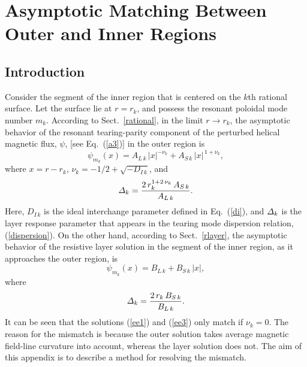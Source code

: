 \documentclass[12pt,prb,aps]{revtex4-1}
\begin{document}
\section{Asymptotic Matching Between Outer and Inner Regions}\label{asym}
\subsection{Introduction}
Consider the segment of the inner region that is centered on the $k$th rational surface. Let the surface lie at $r=r_k$, and possess the
resonant poloidal mode number $m_k$. According to Sect.~\ref{rational},   in the limit $r\rightarrow r_k$,  the asymptotic behavior of the resonant tearing-parity component of the perturbed helical magnetic 
flux, $\psi$,  [see Eq.~(\ref{a3})] in the outer region is
\begin{equation}\label{ee1}
\psi_{m_k}(x) = A_{L\,k}\,|x|^{-\nu_k} + A_{S\,k}\,|x|^{\,1+\nu_k},
\end{equation}
where $x=r-r_k$, $\nu_k= -1/2+\sqrt{-D_{I\,k}}$, and
\begin{equation}
{\mit\Delta}_k = \frac{2\,r_k^{1+2\,\nu_k}\,A_{S\,k}}{A_{L\,k}}.
\end{equation}
Here, $D_{I\,k}$ is the ideal interchange parameter defined in Eq.~(\ref{di}), and ${\mit\Delta}_k$ is the layer response parameter that appears in the
tearing mode dispersion relation, (\ref{dispersion}). On the other hand, according to Sect.~\ref{rlayer}, the asymptotic behavior of the resistive layer
solution in the segment of the inner region, as it approaches the outer region,  is
\begin{equation}\label{ee3}
\psi_{m_k}(x) = B_{L\,k}+B_{S\,k}\,|x|,
\end{equation}
where
\begin{equation}\label{ee4}
{\mit\Delta}_k = \frac{2\,r_k\,B_{S\,k}}{B_{L\,k}}.
\end{equation}
It can be seen that the  solutions (\ref{ee1}) and (\ref{ee3})  only match if $\nu_k=0$. The reason for the mismatch is because the outer solution takes average magnetic field-line curvature into
account,\cite{ggj,ggj1} whereas the layer solution does not. The aim of this appendix is to describe a method for resolving the mismatch. 
\end{document}
